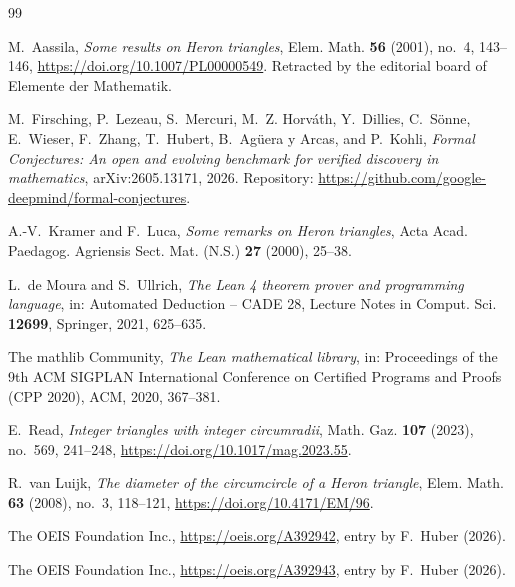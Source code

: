 \documentclass[11pt]{amsart}
\theoremstyle{plain}
\theoremstyle{definition}
\begin{document}
\begin{thebibliography}{99}

M.~Aassila, \emph{Some results on Heron triangles}, Elem. Math. \textbf{56} (2001), no.~4, 143--146, \url{https://doi.org/10.1007/PL00000549}. Retracted by the editorial board of Elemente der Mathematik.

M.~Firsching, P.~Lezeau, S.~Mercuri, M.~Z. Horv\'ath, Y.~Dillies, C.~S\"onne, E.~Wieser, F.~Zhang, T.~Hubert, B.~Ag\"uera y Arcas, and P.~Kohli, \emph{Formal Conjectures: An open and evolving benchmark for verified discovery in mathematics}, arXiv:2605.13171, 2026. Repository: \url{https://github.com/google-deepmind/formal-conjectures}.

A.-V.~Kramer and F.~Luca, \emph{Some remarks on Heron triangles}, Acta Acad. Paedagog. Agriensis Sect. Mat. (N.S.) \textbf{27} (2000), 25--38.

L.~de Moura and S.~Ullrich, \emph{The Lean 4 theorem prover and programming language}, in: Automated Deduction -- CADE 28, Lecture Notes in Comput. Sci. \textbf{12699}, Springer, 2021, 625--635.

The mathlib Community, \emph{The Lean mathematical library}, in: Proceedings of the 9th ACM SIGPLAN International Conference on Certified Programs and Proofs (CPP 2020), ACM, 2020, 367--381.

E.~Read, \emph{Integer triangles with integer circumradii}, Math. Gaz. \textbf{107} (2023), no.~569, 241--248, \url{https://doi.org/10.1017/mag.2023.55}.

R.~van Luijk, \emph{The diameter of the circumcircle of a Heron triangle}, Elem. Math. \textbf{63} (2008), no.~3, 118--121, \url{https://doi.org/10.4171/EM/96}.

The OEIS Foundation Inc., \url{https://oeis.org/A392942}, entry by F.~Huber (2026).

The OEIS Foundation Inc., \url{https://oeis.org/A392943}, entry by F.~Huber (2026).

\end{thebibliography}
\end{document}
